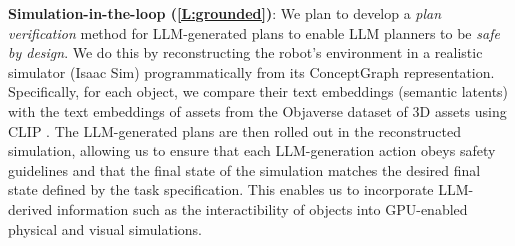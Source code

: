 \documentclass[english,
]{nserc-alliance}
\begin{document}
\textbf{Simulation-in-the-loop (\ref{L:grounded})}: 
%
\newcommand{\todocite}[1]{{\textcolor{red}{(TODO CITE #1)}}}
%
%
%
We plan to develop a \textit{plan verification} method for LLM-generated plans to enable LLM planners to be \textit{safe by design}. We do this by reconstructing the robot's environment in a realistic simulator (Isaac Sim) programmatically from its ConceptGraph \cite{concept-graphs} representation. Specifically, for each object, we compare their text embeddings (semantic latents) with the text embeddings of assets from the Objaverse \cite{objaverse} dataset of 3D assets using CLIP \cite{clip}. The LLM-generated plans are then rolled out in the reconstructed simulation, allowing us to ensure that each LLM-generation action obeys safety guidelines and that the final state of the simulation matches the desired final state defined by the task specification. This enables us to incorporate LLM-derived information such as the interactibility of objects into GPU-enabled physical and visual simulations.
\end{document}
